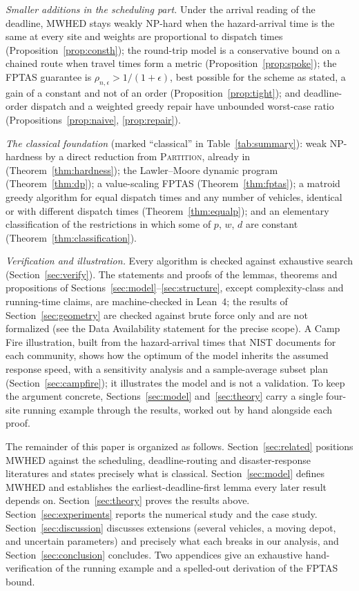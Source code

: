 \documentclass[pdflatex,sn-mathphys-ay]{sn-jnl}
\theoremstyle{thmstyleone}
\theoremstyle{thmstyletwo}
\theoremstyle{thmstylethree}
\begin{document}
\emph{Smaller additions in the scheduling part.} Under the arrival reading of
the deadline, MWHED stays weakly NP-hard when the hazard-arrival time is the
same at every site and weights are proportional to dispatch times
(Proposition~\ref{prop:consth}); the round-trip model is a conservative bound
on a chained route when travel times form a metric
(Proposition~\ref{prop:spoke}); the FPTAS guarantee is
$\rho_{n,\epsilon}>1/(1+\epsilon)$, best possible for the scheme as stated, a
gain of a constant and not of an order (Proposition~\ref{prop:tight}); and
deadline-order dispatch and a weighted greedy repair have unbounded
worst-case ratio (Propositions~\ref{prop:naive}, \ref{prop:repair}).

\emph{The classical foundation} (marked ``classical'' in
Table~\ref{tab:summary}): weak NP-hardness by a direct reduction from
\textsc{Partition}, already in \citet{karp1972} (Theorem~\ref{thm:hardness});
the Lawler--Moore dynamic program \citep{lawlermoore1969}
(Theorem~\ref{thm:dp}); a value-scaling FPTAS \citep{sahni1976,gensl1981}
(Theorem~\ref{thm:fptas}); a matroid greedy algorithm for equal dispatch
times and any number of vehicles, identical or with different dispatch times
\citep{lawler1976,dessouky1990} (Theorem~\ref{thm:equalp}); and an elementary
classification of the restrictions in which some of $p$, $w$, $d$ are
constant (Theorem~\ref{thm:classification}).

\emph{Verification and illustration.} Every algorithm is checked against
exhaustive search (Section~\ref{sec:verify}). The statements and proofs of
the lemmas, theorems and propositions of
Sections~\ref{sec:model}--\ref{sec:structure}, except complexity-class and
running-time claims, are machine-checked in Lean~4; the results of
Section~\ref{sec:geometry} are checked against brute force only and are not
formalized (see the Data Availability statement for the precise scope). A
Camp Fire illustration, built from the hazard-arrival times that NIST
documents for each community, shows how the optimum of the model inherits the
assumed response speed, with a sensitivity analysis and a sample-average
subset plan (Section~\ref{sec:campfire}); it illustrates the model and is not
a validation.
To keep the argument concrete, Sections~\ref{sec:model}
and~\ref{sec:theory} carry a single four-site running example through the
results, worked out by hand alongside each proof.

The remainder of this paper is organized as follows.
Section~\ref{sec:related} positions MWHED against the scheduling,
deadline-routing and disaster-response literatures and states precisely
what is classical. Section~\ref{sec:model} defines MWHED and
establishes the earliest-deadline-first lemma every later result
depends on. Section~\ref{sec:theory} proves the results above.
Section~\ref{sec:experiments} reports the numerical study and the case
study. Section~\ref{sec:discussion} discusses extensions (several
vehicles, a moving depot, and uncertain parameters) and precisely what
each breaks in our analysis, and Section~\ref{sec:conclusion}
concludes. Two appendices give an exhaustive hand-verification of the
running example and a spelled-out derivation of the FPTAS bound.
\end{document}
